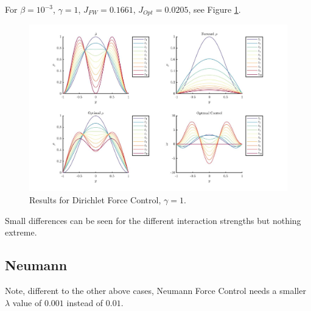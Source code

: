 \documentclass[11pt, a4paper]{article}
\theoremstyle{definition}
\begin{document}
For $\beta = 10^{-3}$, $\gamma = 1$, $J_{FW} = 0.1661$, $J_{Opt} = 0.0205$, see Figure \ref{ResFD1b}.
\begin{figure}[h]
	\includegraphics[scale=0.3]{ResFD1b.jpg}
	\caption{Results for Dirichlet Force Control, $\gamma = 1$.}
	\label{ResFD1b}
\end{figure}
Small differences can be seen for the different interaction strengths but nothing extreme.

\subsection{Neumann}
Note, different to the other above cases, Neumann Force Control needs a smaller $\lambda$ value of $0.001$ instead of $0.01$.
\end{document}
